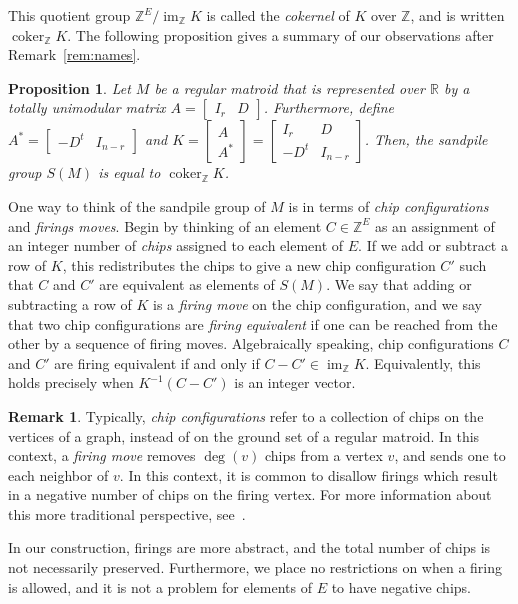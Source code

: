 \documentclass[12p]{amsart}
\numberwithin{equation}{section}
\theoremstyle{plain}
\newtheorem{prop}[thm]{Proposition}
\theoremstyle{definition}
\newtheorem{remark}[thm]{Remark}
\newcommand{\Z}{\mathbb {Z}}
\DeclareMathOperator{\im}{im}
\DeclareMathOperator{\coker}{coker}
\begin{document}
This quotient group $\Z^E/\im_{\Z}K$ is called the \emph{cokernel} of $K$ over $\mathbb Z$, and is written $\coker_\Z K$. The following proposition gives a summary of our observations after Remark~\ref{rem:names}. 

\begin{prop}
     Let $M$ be a regular matroid that is represented over $\mathbb R$ by a totally unimodular matrix $A = \begin{bmatrix} I_r & D\end{bmatrix}$. Furthermore, define $A^*= \begin{bmatrix} -D^t & I_{n-r}\end{bmatrix}$ and $K = \begin{bmatrix} A \\ A^*\end{bmatrix} = \begin{bmatrix} I_r & D \\ -D^t & I_{n-r}\end{bmatrix}$. Then, the \emph{sandpile group} $S(M)$ is equal to $\coker_{\mathbb Z} K$. 
\end{prop}

One way to think of the sandpile group of $M$ is in terms of \emph{chip configurations} and \emph{firings moves}. Begin by thinking of an element $C \in \Z^E$ as an assignment of an integer number of \emph{chips} assigned to each element of $E$. If we add or subtract a row of $K$, this redistributes the chips to give a new chip configuration $C'$ such that $C$ and $C'$ are equivalent as elements of $S(M)$. We say that adding or subtracting a row of $K$ is a \emph{firing move} on the chip configuration, and we say that two chip configurations are \emph{firing equivalent} if one can be reached from the other by a sequence of firing moves. Algebraically speaking, chip configurations $C$ and $C'$ are firing equivalent if and only if $C - C' \in \im_{\Z} K$. Equivalently, this holds precisely when $K^{-1}(C-C')$ is an integer vector. 

\begin{remark}\label{rem:traditional}
    Typically, \emph{chip configurations} refer to a collection of chips on the vertices of a graph, instead of on the ground set of a regular matroid. In this context, a \emph{firing move} removes $\deg(v)$ chips from a vertex $v$, and sends one to each neighbor of $v$. In this context, it is common to disallow firings which result in a negative number of chips on the firing vertex. For more information about this more traditional perspective, see~\cite{Klivans}. 
    
    In our construction, firings are more abstract, and the total number of chips is not necessarily preserved. Furthermore, we place no restrictions on when a firing is allowed, and it is not a problem for elements of $E$ to have negative chips. 
\end{remark}
\end{document}
